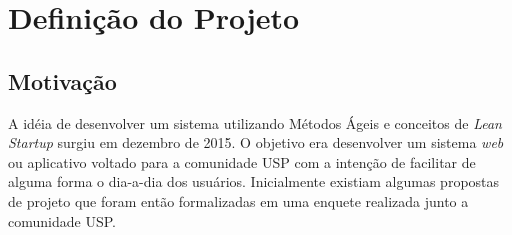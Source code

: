 \label{cap:uspeventos}
\section{Definição do Projeto}
\subsection{Motivação}
        \par A idéia de desenvolver um sistema utilizando Métodos Ágeis e conceitos de \emph{Lean Startup} surgiu em dezembro de 2015. O objetivo era desenvolver um sistema \emph{web} ou aplicativo voltado para a comunidade USP com a intenção de facilitar de alguma forma o dia-a-dia dos usuários. Inicialmente existiam algumas propostas de projeto que foram então formalizadas em uma enquete realizada junto a comunidade USP.
